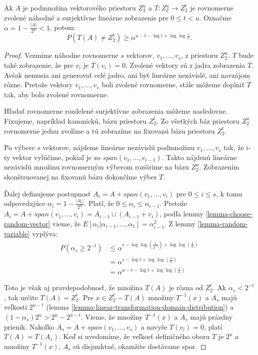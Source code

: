\begin{theorem}
\label{theorem-linear-function-set-onto}
Ak $A$ je podmnožina vektorového priestoru $Z_2^u$ a $T: Z_2^u \rightarrow Z_2^t$ je rovnomerne zvolené náhodné a surjektívne lineárne zobrazenie pre $0 \leq t < u$. Označme $\alpha = 1 - \frac{|A|}{2^u} < 1$, potom:
\begin{displaymath}
P(T(A) \neq Z_2^t) \geq \alpha^{u - t - \log t + \log \log \frac{1}{\alpha}} \textit{.}
\end{displaymath}
\end{theorem}
\begin{proof}
Vezmime náhodne rovnomerne $s$ vektorov, $v_1, \dots, v_s$, z priestoru $Z_2^u$. $T$ bude také zobrazenie, že pre $v_i$ je $T(v_i) = 0$. Zvolené vektory sú z jadra zobrazenia $T$. Avšak nemusia ani generovať celé jadro, ani byť lineárne nezávislé, ani navzájom rôzne. Pretože vektory $v_1, \dots, v_s$ boli zvolené rovnomerne, stále môžeme doplniť $T$ tak, aby bolo zvolené rovnomerne. 

Hľadať rovnomerne rozdelené surjektívne zobrazenia môžeme nasledovne. Fixujeme, napríklad kanonickú, bázu priestoru $Z_2^t$. Zo všetkých báz priestoru $Z_2^u$ rovnomerne jednu zvolíme a tú zobrazíme na fixovanú bázu priestoru $Z_2^t$. 

Po výbere $s$ vektorov, nájdeme lineárne nezávislú podmnožinu $v_1, \dots, v_s$ tak, že $i$-ty vektor vylúčime, pokiaľ je zo $span(v_1, \dots, v_{i-1})$. Takto nájdenú lineárne nezávislú množinu rovnomerným výberom rozšírime na bázu $Z_2^u$. Zobrazením skonštruovanej na fixovanú bázu dokončíme výber $T$.

Ďalej definujeme postupnosť $A_i = A + span(v_1, \dots, v_i)$ pre $0 \leq i \leq s$, k tomu odpovedajúce $\alpha_i = 1 - \frac{|A_i|}{2^u}$. Platí, že $0 \leq \alpha_i \leq \alpha_{i-1}$. Pretože $A_{i} = A + span(v_1, \dots, v_i) = A_{i-1} \cup (A_{i-1} + v_i)$, podľa lemmy \ref{lemma-choose-random-vector} vieme, že $E[\alpha_i | \alpha_{i-1}, \dots, \alpha_1] = \alpha_{i-1}^2$. Z lemmy \ref{lemma-random-variable} vyplýva:
\begin{displaymath}
\begin{split}
P(\alpha_s \geq 2^{-t}) 
	& \leq \alpha^{s - \log \log (\frac{1}{2^{-t}}) + \log \log (\frac{1}{\alpha})} \\
	& = \alpha^{s - \log t + \log \log (\frac{1}{\alpha})} \\
	& = \alpha^{u - t - \log t + \log \log (\frac{1}{\alpha})}
\end{split}
\end{displaymath}

Toto je však aj pravdepodobnosť, že množina $T(A)$ je rôzna od $Z_2^t$. Ak $\alpha_s < 2^{-t}$, tak určite $T(A) = Z_2^t$. Pre $x \in Z_2^t - T(A)$ množiny $T^{-1}(x)$ a $A_s$ majú veľkosti $2^{u-t}$ (lemma \ref{lemma-linear-transformation-domain-distribution}) a $(1 - \alpha_s)2^u > 2^u - 2^{u-t}$. Vieme, že množiny $T^{-1}(x)$ a $A_s$ majú prázdny prienik. Nakoľko $A_s = A + span(v_1, \dots, v_s)$ a navyše $T(v_i) = 0$, platí $T(A) = T(A_s)$. Keď si uvedomíme, že veľkosť definičného oboru $T$ je $2^u$ a množiny $T^{-1}(x)$, $A_s$ sú disjunktné, okamžite dostávame spor.
\end{proof}

